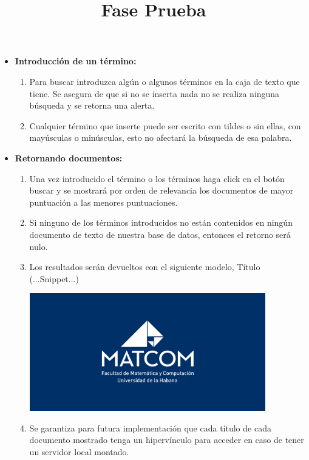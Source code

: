 \documentclass{article}
\begin{document}
\title{\textbf{Fase Prueba}}
    \begin{itemize}
        \item \textbf{Introducción de un término:}
            \begin{enumerate}
                \item Para buscar introduzca algún o algunos términos en la caja de texto que tiene. Se asegura de
                que si no se inserta nada no se realiza ninguna búsqueda y se retorna una alerta.
                \item Cualquier término que inserte puede ser escrito con tildes o sin ellas, con mayúsculas o
                minúsculas, esto no afectará la búsqueda de esa palabra.
            \end{enumerate}
        \item \textbf{Retornando documentos:}
            \begin{enumerate}
                \item Una vez introducido el término o los términos haga click en el botón buscar y se mostrará
                por orden de relevancia los documentos de mayor puntuación a las menores puntuaciones.
                \item Si ninguno de los términos introducidos no están contenidos en ningún documento de texto
                de nuestra base de datos, entonces el retorno será nulo.
                \item Los resultados serán devueltos con el siguiente modelo, Título (...Snippet...)
                
                \includegraphics[width=0.85\textwidth]{87f4e980-62a6-11eb-846f-4c58547cffc0.png}

                \item Se garantiza para futura implementación que cada título de cada documento mostrado tenga
                un hipervínculo para acceder en caso de tener un servidor local montado.


\end{enumerate}
\end{itemize}
\end{document}
